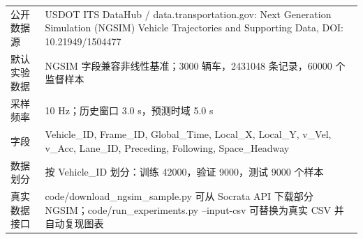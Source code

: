 \begin{tabularx}{\textwidth}{lX}
\toprule
公开数据源 & USDOT ITS DataHub / data.transportation.gov: Next Generation Simulation (NGSIM) Vehicle Trajectories and Supporting Data, DOI: 10.21949/1504477 \\ 
默认实验数据 & NGSIM 字段兼容非线性基准；3000 辆车，2431048 条记录，60000 个监督样本 \\ 
采样频率 & 10 Hz；历史窗口 3.0 s，预测时域 5.0 s \\ 
字段 & Vehicle\_ID, Frame\_ID, Global\_Time, Local\_X, Local\_Y, v\_Vel, v\_Acc, Lane\_ID, Preceding, Following, Space\_Headway \\ 
数据划分 & 按 Vehicle\_ID 划分：训练 42000，验证 9000，测试 9000 个样本 \\ 
真实数据接口 & code/download\_ngsim\_sample.py 可从 Socrata API 下载部分 NGSIM；code/run\_experiments.py --input-csv 可替换为真实 CSV 并自动复现图表 \\ 
\bottomrule
\end{tabularx}
